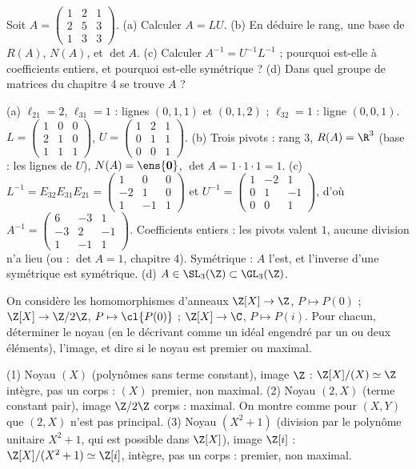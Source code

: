 \begin{exo}
Soit $A=\begin{pmatrix}1&2&1\\2&5&3\\1&3&3\end{pmatrix}$. (a) Calculer $A=LU$. (b) En déduire le rang, une base de $R(A)$, $N(A)$, et $\det A$. (c) Calculer $A^{-1}=U^{-1}L^{-1}$ ; pourquoi est-elle à coefficients entiers, et pourquoi est-elle symétrique ? (d) Dans quel groupe de matrices du chapitre 4 se trouve $A$ ?
\begin{corrige}
(a) $\ell_{21}=2$, $\ell_{31}=1$ : lignes $(0,1,1)$ et $(0,1,2)$ ; $\ell_{32}=1$ : ligne $(0,0,1)$. $L=\begin{pmatrix}1&0&0\\2&1&0\\1&1&1\end{pmatrix}$, $U=\begin{pmatrix}1&2&1\\0&1&1\\0&0&1\end{pmatrix}$.
(b) Trois pivots : rang 3, $R(A)=\R^3$ (base : les lignes de $U$), $N(A)=\ens{\mathbf 0}$, $\det A=1\cdot1\cdot1=1$.
(c) $L^{-1}=E_{32}E_{31}E_{21}=\begin{pmatrix}1&0&0\\-2&1&0\\1&-1&1\end{pmatrix}$ et $U^{-1}=\begin{pmatrix}1&-2&1\\0&1&-1\\0&0&1\end{pmatrix}$, d'où $A^{-1}=\begin{pmatrix}6&-3&1\\-3&2&-1\\1&-1&1\end{pmatrix}$. Coefficients entiers : les pivots valent $1$, aucune division n'a lieu (ou : $\det A=1$, chapitre 4). Symétrique : $A$ l'est, et l'inverse d'une symétrique est symétrique.
(d) $A\in\SL_3(\Z)\subset\GL_3(\Z)$.
\end{corrige}
\end{exo}
\begin{exo}
On considère les homomorphismes d'anneaux $\Z[X]\to\Z$, $P\mapsto P(0)$ ; $\Z[X]\to\Z/2\Z$, $P\mapsto\cl{P(0)}$ ; $\Z[X]\to\C$, $P\mapsto P(i)$. Pour chacun, déterminer le noyau (en le décrivant comme un idéal engendré par un ou deux éléments), l'image, et dire si le noyau est premier ou maximal.
\begin{corrige}
(1) Noyau $(X)$ (polynômes sans terme constant), image $\Z$ : $\Z[X]/(X)\simeq\Z$ intègre, pas un corps : $(X)$ premier, non maximal. (2) Noyau $(2,X)$ (terme constant pair), image $\Z/2\Z$ corps : maximal. On montre comme pour $(X,Y)$ que $(2,X)$ n'est pas principal. (3) Noyau $(X^2+1)$ (division par le polynôme unitaire $X^2+1$, qui est possible dans $\Z[X]$), image $\Z[i]$ : $\Z[X]/(X^2+1)\simeq\Z[i]$, intègre, pas un corps : premier, non maximal.
\end{corrige}
\end{exo}
